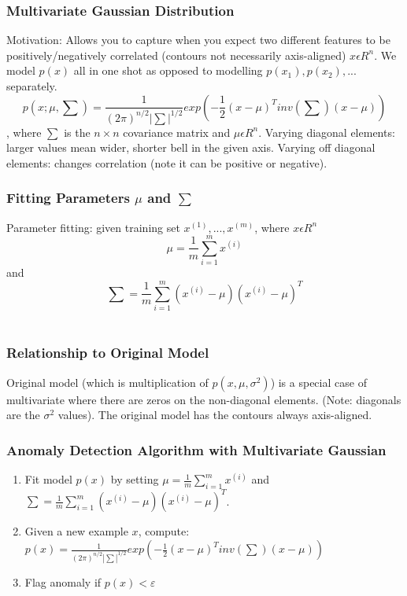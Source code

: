 \documentclass[11pt,letterpaper]{article}
\begin{document}
\subsubsection{Multivariate Gaussian Distribution}
Motivation: Allows you to capture when you expect two different features to be positively/negatively correlated (contours not necessarily axis-aligned)
$x \epsilon R^n$. We model $p(x)$ all in one shot as opposed to modelling $p(x_1), p(x_2),...$ separately.
$$p(x;\mu, \sum) = \frac{1}{(2\pi)^{n/2}|\sum|^{1/2}} exp(-\frac{1}{2}(x-\mu)^Tinv(\sum)(x-\mu)) $$, where $\sum$ is the $n \times n$ covariance matrix and $\mu \epsilon R^n $. Varying diagonal elements: larger values mean wider, shorter bell in the given axis. Varying off diagonal elements: changes correlation (note it can be positive or negative).
 \subsubsection{Fitting Parameters $\mu$ and $\sum$}
 Parameter fitting: given training set $x^{(1)},...,x^{(m)}$, where $x \epsilon R^n$ $$\mu = \frac{1}{m	}\sum_{i=1}^{m}x^{(i)}$$ and $$\sum = \frac{1}{m}\sum_{i=1}^{m}(x^{(i)} - \mu)(x^{(i)} - \mu)^T $$\\
\subsubsection{Relationship to Original Model}
Original model (which is multiplication of $p(x, \mu, \sigma^2)$) is a special case of multivariate where there are zeros on the non-diagonal elements.  (Note: diagonals are the $\sigma^2$ values). The original model has the contours always axis-aligned.
\subsubsection{Anomaly Detection Algorithm with Multivariate Gaussian}
\begin{enumerate}
	\item Fit model $p(x)$ by setting $\mu = \frac{1}{m} \sum_{i=1}^{m}x^{(i)}$ and $\sum = \frac{1}{m}\sum_{i=1}^{m}(x^{(i)} - \mu)(x^{(i)}	 - \mu)^{T}$.
	\item Given a new example $x$, compute: $p(x) = \frac{1}{(2\pi)^{n/2}|\sum|^{1/2}} exp(-\frac{1}{2}(x-\mu)^Tinv(\sum)(x-\mu)) $
	\item Flag anomaly if $p(x) < \varepsilon$
\end{enumerate}
\end{document}
